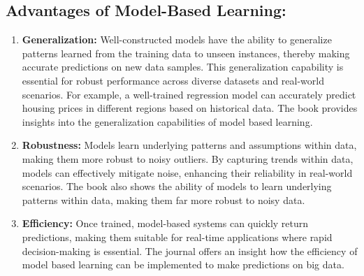 \documentclass[a4paper, 12pt]{report}
\begin{document}
\subsection{Advantages of Model-Based Learning:}
\begin{enumerate}
	\item \textbf{Generalization:} Well-constructed models have the ability to generalize patterns learned from the training data to unseen instances, thereby making accurate predictions on new data samples.
	      This generalization capability is essential for robust performance across diverse datasets and real-world scenarios.
	      For example, a well-trained regression model can accurately predict housing prices in different regions based on historical data.
          The book \cite{bishop2006pattern} provides insights into the generalization capabilities of model based learning.
	\item \textbf{Robustness:} Models learn underlying patterns and assumptions within data, making them more robust to noisy outliers.
	      By capturing trends within data, models can effectively mitigate noise, enhancing their reliability in real-world scenarios.
          The book \cite{bishop2006pattern} also shows the ability of models to learn underlying patterns within data, making them far more robust to noisy data.
	\item \textbf{Efficiency:} Once trained, model-based systems can quickly return predictions, 
           making them suitable for real-time applications where rapid decision-making is essential. 
           The journal \cite{gupta2016scalable} offers an insight how the efficiency of model based learning can be implemented to make predictions on big data.

\end{enumerate}
\end{document}
